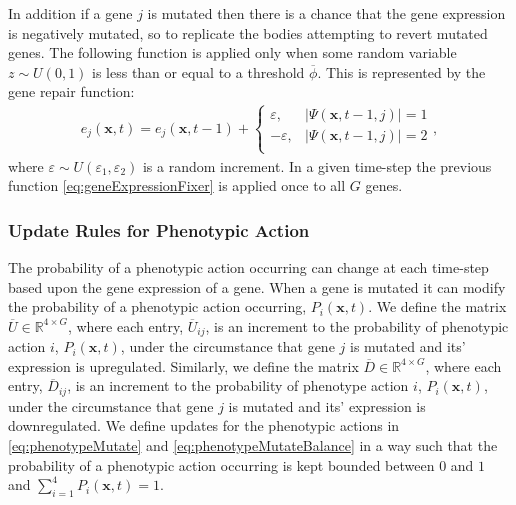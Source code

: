 \documentclass[\main/thesis.tex]{subfiles}
\begin{document}
In addition if a gene $j$ is mutated then there is a chance that the gene 
expression is negatively mutated, so to replicate the bodies
attempting to revert mutated genes. The following function is applied only when 
some random variable $z {\sim} U(0,1)$ is less than or equal to a threshold $\overline{\phi}$.
This is represented by the gene repair function:
\begin{align}
e_j(\boldsymbol{x}, t) {=} e_j(\boldsymbol{x}, t{-}1) {+}
\begin{cases}
    \varepsilon, 
      & |\Psi(\boldsymbol{x}, t{-}1, j)| {=} 1 \\
    {-} \varepsilon, 
      & |\Psi(\boldsymbol{x}, t{-}1, j)| {=} 2 \\
\end{cases},
\label{eq:geneExpressionFixer}
\end{align}
where $\varepsilon {\sim} U(\varepsilon_1, \varepsilon_2)$ is a random increment.  
In a given time-step the previous function \eqref{eq:geneExpressionFixer} is applied once to all $G$ genes.

\subsubsection{Update Rules for Phenotypic Action}
The probability of a phenotypic action occurring can change at each time-step based upon the gene expression of a gene. When a gene is mutated it can modify the probability of a phenotypic action occurring, $P_i(\boldsymbol{x}, t)$.
We define the matrix $\overline{U} {\in} \mathbb{R}^{4{\times}G}$, where each entry, 
$\overline{U}_{ij}$, is an increment to the probability of phenotypic action $i$,
$P_i(\boldsymbol{x}, t)$, under the circumstance that gene $j$ is mutated and its' 
expression is upregulated. Similarly, we define the matrix
$\overline{D} {\in} \mathbb{R}^{4{\times}G}$, where each entry, $\overline{D}_{ij}$, is 
an increment to the probability of phenotype action $i$, $P_i(\boldsymbol{x}, t)$, under the circumstance that gene $j$ is mutated and its' expression is downregulated. We define updates for the phenotypic actions in \eqref{eq:phenotypeMutate} and \eqref{eq:phenotypeMutateBalance} in a way such that  the probability of a phenotypic action occurring is kept bounded between $0$ and $1$ and
$\sum_{i{=}1}^{4} P_i(\boldsymbol{x}, t) {=} 1$. 
\end{document}
